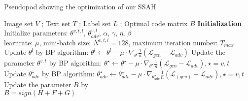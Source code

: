 \documentclass[10pt,twocolumn,letterpaper]{article}
\begin{document}
\begin{algorithm}[!t]
	 \scriptsize
	\caption{Pseudopod showing the optimization of our SSAH}
	\label{alg::algorithm}
	\begin{algorithmic}
		\REQUIRE Image set $V$ ; Text set $T$ ; Label set $L$ ;
		\ENSURE Optimal code matrix $B$
		\STATE \textbf{Initialization} \STATE Initialize parameters: $\theta ^{v,t,l}$, $\theta_{adv}^{v,t}$, $\alpha$, $\gamma$, $\eta$, $\beta$\\ 
		\STATE learnrate: $\mu$, mini-batch size: $N^{v,t,l}=128$, maximum iteration number: $T_{max}$.
		\REPEAT
		\STATE Update $\theta ^{l}$ by BP algorithm:
		\STATE ${ \theta  }^{ l }\leftarrow { \theta  }^{ l }-\mu \cdot { \nabla  }_{ { \theta  }^{l} }\frac { 1 }{ n } \left( { \mathcal{L} }_{gen}-{ \mathcal{L} }_{adv} \right)$
		\STATE Update the parameter $\theta ^{v,t}$ by BP algorithm:
		\STATE ${ \theta  }^{\star}\leftarrow { \theta  }^{\star}-\mu \cdot { \nabla  }_{ { \theta  }^{\star} }\frac { 1 }{ n } \left( { \mathcal{L} }_{ gen }-{ \mathcal{L} }_{ adv } \right), \star = v,t$
		\STATE Update ${ \theta}_{adv}^{\star}$ by BP algorithm:
		\STATE ${\theta}^{\star}_{adv}\leftarrow { \theta  }^{\star}_{adv}-\mu \cdot { \nabla  }_{ { \theta  }^{\star}_{adv} }\frac { 1 }{ n } \left( { \mathcal{L} }_{ (gen) }-{ \mathcal{L} }_{adv} \right) , \star = v,t$
		\ENDFOR
		\STATE Update the parameter $B$ by \\
		$B = sign(H+F+G)$
	\end{algorithmic}
\end{algorithm}
\vspace{-0.25cm}
\end{document}
